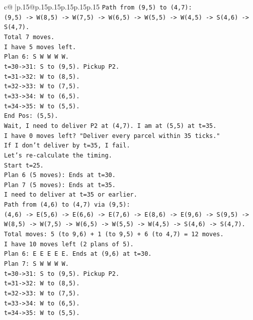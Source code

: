 \documentclass{article}
\begin{document}
{\begin{supertabular}{c@{$\;$}|p{.15\linewidth}@{}p{.15\linewidth}p{.15\linewidth}p{.15\linewidth}p{.15\linewidth}p{.15\linewidth}}
{{{\texttt{Path from (9,5) to (4,7):} \\
\texttt{(9,5) {-}> W(8,5) {-}> W(7,5) {-}> W(6,5) {-}> W(5,5) {-}> W(4,5) {-}> S(4,6) {-}> S(4,7).} \\
\texttt{Total 7 moves.} \\
\texttt{I have 5 moves left.} \\
\texttt{Plan 6: S W W W W.} \\
\texttt{t=30{-}>31: S to (9,5). Pickup P2.} \\
\texttt{t=31{-}>32: W to (8,5).} \\
\texttt{t=32{-}>33: W to (7,5).} \\
\texttt{t=33{-}>34: W to (6,5).} \\
\texttt{t=34{-}>35: W to (5,5).} \\
\texttt{End Pos: (5,5).} \\
\texttt{Wait, I need to deliver P2 at (4,7). I am at (5,5) at t=35.} \\
\texttt{I have 0 moves left? "Deliver every parcel within 35 ticks."} \\
\texttt{If I don't deliver by t=35, I fail.} \\
\texttt{Let's re{-}calculate the timing.} \\
\texttt{Start t=25.} \\
\texttt{Plan 6 (5 moves): Ends at t=30.} \\
\texttt{Plan 7 (5 moves): Ends at t=35.} \\
\texttt{I need to deliver at t=35 or earlier.} \\
\texttt{Path from (4,6) to (4,7) via (9,5):} \\
\texttt{(4,6) {-}> E(5,6) {-}> E(6,6) {-}> E(7,6) {-}> E(8,6) {-}> E(9,6) {-}> S(9,5) {-}> W(8,5) {-}> W(7,5) {-}> W(6,5) {-}> W(5,5) {-}> W(4,5) {-}> S(4,6) {-}> S(4,7).} \\
\texttt{Total moves: 5 (to 9,6) + 1 (to 9,5) + 6 (to 4,7) = 12 moves.} \\
\texttt{I have 10 moves left (2 plans of 5).} \\
\texttt{Plan 6: E E E E E. Ends at (9,6) at t=30.} \\
\texttt{Plan 7: S W W W W.} \\
\texttt{t=30{-}>31: S to (9,5). Pickup P2.} \\
\texttt{t=31{-}>32: W to (8,5).} \\
\texttt{t=32{-}>33: W to (7,5).} \\
\texttt{t=33{-}>34: W to (6,5).} \\
\texttt{t=34{-}>35: W to (5,5).} \\
}}}
\end{supertabular}}
\end{document}
